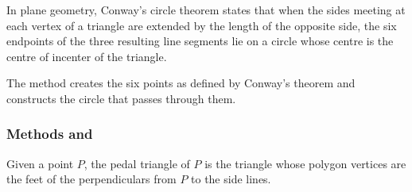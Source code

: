 In plane geometry, Conway's circle theorem states that when the sides meeting at each vertex of a triangle are extended by the length of the opposite side, the six endpoints of the three resulting line segments lie on a circle whose centre is the centre of incenter of the triangle.

The method  creates the six points as defined by Conway’s theorem and constructs the circle that passes through them.

\vspace{1em}
\begin{tkzexample}[latex=.5\textwidth]
\end{tkzexample}

\subsubsection{Methods  and } %
\label{ssub:method_triangle_pedal}

Given a point $P$, the pedal triangle of $P$ is the triangle whose polygon vertices are the feet of the perpendiculars from $P$ to the side lines.

